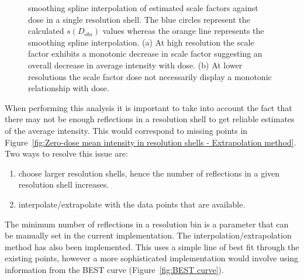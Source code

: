 \begin{figure}
\begin{subfigure}[b]{1\textwidth}
                \caption{}
                \label{fig:scale factor not monotonic - Extrapolation method}
        \end{subfigure}
        \caption{smoothing spline interpolation of estimated scale factors against dose in a single resolution shell.
        The blue circles represent the calculated $s(D_{obs})$ values whereas the orange line represents the smoothing spline interpolation.
        (a) At high resolution the scale factor exhibits a monotonic decrease in scale factor suggesting an overall decrease in average intensity with dose.
        (b) At lower resolutions the scale factor dose not necessarily display a monotonic relationship with dose.}
        \label{fig:Scale factors, smoothing interpolation - Extrapolation method}
\end{figure}

When performing this analysis it is important to take into account the fact that there may not be enough reflections in a resolution shell to get reliable estimates of the average intensity.
This would correspond to missing points in Figure~\ref{fig:Zero-dose mean intensity in resolution shells - Extrapolation method}.
Two ways to resolve this issue are:
\begin{enumerate}
    \item choose larger resolution shells, hence the number of reflections in a given resolution shell increases.
    \item interpolate/extrapolate with the data points that are available.
\end{enumerate}
The minimum number of reflections in a resolution bin is a parameter that can be manually set in the current implementation. The interpolation/extrapolation method has also been implemented.
This uses a simple line of best fit through the existing points, however a more sophisticated implementation would involve using information from the BEST curve (Figure~\ref{fig:BEST curve}).

